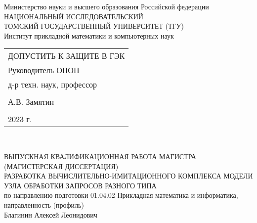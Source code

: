 \begin{center}\linespread{1}
	\normalsize{Министерство науки и высшего образования Российской федерации}\\
	\normalsize{НАЦИОНАЛЬНЫЙ ИССЛЕДОВАТЕЛЬСКИЙ}\\ 
	\normalsize{ТОМСКИЙ ГОСУДАРСТВЕННЫЙ УНИВЕРСИТЕТ (ТГУ)}\\
	\normalsize{Институт прикладной математики и компьютерных наук}\\
	\hfill\break
	
\end{center}
\begin{flushright}\linespread{0.9}
	\normalsize{ 
		\begin{tabular}{@{}l@{}}
			ДОПУСТИТЬ К ЗАЩИТЕ В ГЭК\\ 
			Руководитель ОПОП\\  д-р техн. наук,  профессор\\\\ \underline{\hspace{3.5cm}} А.В. Замятин\\\\
			\textquote{\underline{\hspace{1cm}}}\underline{\hspace{4cm}}2023 г.	
		\end{tabular}	
	}\\
\end{flushright}
\hfill \break
\hfill \break
\begin{center}\linespread{1}
	\large{ВЫПУСКНАЯ КВАЛИФИКАЦИОННАЯ РАБОТА МАГИСТРА}\\
	\large{(МАГИСТЕРСКАЯ ДИССЕРТАЦИЯ)}\\
	\hfill \break
	\large{РАЗРАБОТКА ВЫЧИСЛИТЕЛЬНО-ИМИТАЦИОННОГО КОМПЛЕКСА МОДЕЛИ УЗЛА ОБРАБОТКИ ЗАПРОСОВ РАЗНОГО ТИПА}\\
	\hfill\break
	\normalsize{по направлению подготовки 01.04.02 Прикладная математика и информатика,\\
	направленность (профиль)  }\\
	\hfill \break
	\hfill \break
	\hfill \break
	\normalsize{Благинин Алексей Леонидович}\\
	\hfill \break
	\hfill \break
\end{center}
